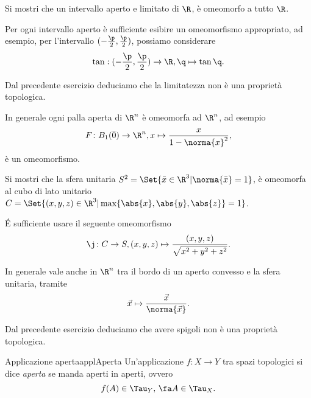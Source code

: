 \begin{exe}
	Si mostri che un intervallo aperto e limitato di \(\R\), è omeomorfo a tutto \(\R\).
\end{exe}

\begin{sol}
	Per ogni intervallo aperto è sufficiente esibire un omeomorfismo appropriato, ad esempio, per l'intervallo \((-\frac{\p}{2},\frac{\p}{2})\), possiamo considerare
	\[
		\tan:(-\frac{\p}{2},\frac{\p}{2})\to\R,\q\mapsto\tan\q.
	\]
\end{sol}

\begin{oss}
	Dal precedente esercizio deduciamo che la limitatezza non è una proprietà topologica.
\end{oss}

\begin{oss}
	In generale ogni palla aperta di \(\R^n\) è omeomorfa ad \(\R^n\), ad esempio
	\[
		F\colon B_1(\bar{0})\to\R^n,x\mapsto\frac{x}{1-\norma{x}^2},
	\]
	è un omeomorfismo.
\end{oss}

\begin{exe}
	Si mostri che la sfera unitaria \(S^2=\Set{\bar{x}\in\R^3 | \norma{\bar{x}}=1}\), è omeomorfa al cubo di lato unitario \(C=\Set{(x,y,z)\in\R^3 | \max\{\abs{x},\abs{y},\abs{z}\}=1}\).
\end{exe}

\begin{sol}
	\'E sufficiente usare il seguente omeomorfismo
	\[
		\j\colon C\to S,(x,y,z)\mapsto\frac{(x,y,z)}{\sqrt{x^2+y^2+z^2}}.
	\]
\end{sol}

\begin{oss}
	In generale vale anche in \(\R^n\) tra il bordo di un aperto convesso e la sfera unitaria, tramite
	\[
		\vec{x}\mapsto\frac{\vec{x}}{\norma{\vec{x}}}.
	\]
\end{oss}

\begin{oss}
	Dal precedente esercizio deduciamo che avere spigoli non è una proprietà topologica.
\end{oss}

\begin{defn}{Applicazione aperta}{applAperta}
	Un'applicazione \(f\colon X\to Y\) tra spazi topologici si dice \emph{aperta} se manda aperti in aperti, ovvero
	\[
		f(A)\in \Tau_Y,\,\fa A\in \Tau_X.
	\]
\end{defn}

